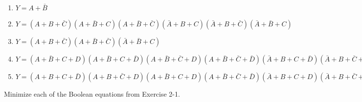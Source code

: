 \documentclass[12pt]{article}
\newenvironment{ex}[2][Exercise]{\begin{trivlist}
		\item[\hskip \labelsep {\bfseries #1}\hskip \labelsep {\bfseries #2.}]}{\end{trivlist}}
\newenvironment{sol}[1][Solution]{\begin{trivlist}
		\item[\hskip \labelsep {\bfseries #1:}]}{\end{trivlist}}
\begin{document}
\begin{sol} \
	\begin{enumerate}[label=(\alph*)]
		\item $Y=A+\bar{B}$
		\item $Y=(A+B+\bar{C})(A+\bar{B}+C)(A+\bar{B}+\bar{C})(\bar{A}+B+C)(\bar{A}+B+\bar{C})(\bar{A}+\bar{B}+C)$
		\item $Y=(A+B+\bar{C})(A+\bar{B}+\bar{C})(\bar{A}+\bar{B}+C)$
		\item $Y=(A+\bar{B}+C+D)(A+\bar{B}+C+\bar{D})(A+\bar{B}+\bar{C}+D)(A+\bar{B}+\bar{C}+\bar{D})(\bar{A}+B+C+\bar{D})(\bar{A}+B+\bar{C}+\bar{D})(\bar{A}+\bar{B}+C+D)(\bar{A}+\bar{B}+C+\bar{D})(\bar{A}+\bar{B}+\bar{C}+\bar{D})$
		\item $Y=(A+B+C+\bar{D})(A+B+\bar{C}+D)(A+\bar{B}+C+D)(A+\bar{B}+\bar{C}+\bar{D})(\bar{A}+B+C+D)(\bar{A}+B+\bar{C}+\bar{D})(\bar{A}+\bar{B}+C+\bar{D})(\bar{A}+\bar{B}+\bar{C}+D)$
	\end{enumerate}
\end{sol}

\begin{ex}{2-5}
	Minimize each of the Boolean equations from Exercise 2-1.
\end{ex}
\end{document}
